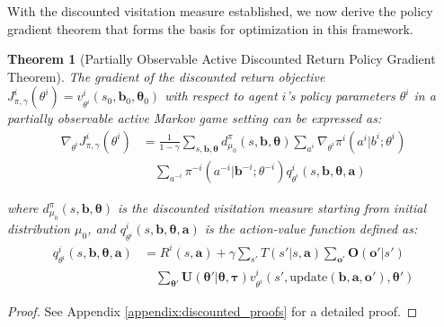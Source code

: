 \documentclass[a4paper,12pt]{report}
\newtheorem{theorem}{Theorem}
\begin{document}
With the discounted visitation measure established, we now derive the policy gradient theorem that forms the basis for optimization in this framework.
\begin{theorem}[Partially Observable Active Discounted Return Policy Gradient Theorem]
    \label{thm:discounted_gradient}
    The gradient of the discounted return objective $J^i_{\pi, \gamma}(\theta^i) = v^i_{\theta^i}(s_0, \boldsymbol{b}_0, \boldsymbol{\theta}_0)$ with respect to agent $i$'s policy parameters $\theta^i$ in a partially observable active Markov game setting can be expressed as:
    \begin{align}
        \nabla_{\theta^i} J^{i}_{\pi, \gamma}(\theta^i) & = \frac{1}{1-\gamma} \sum_{s, \boldsymbol{b}, \boldsymbol{\theta}} d^{\pi}_{\mu_0}(s, \boldsymbol{b}, \boldsymbol{\theta}) \sum_{a^i} \nabla_{\theta^i} \pi^i(a^i|b^i; \theta^i) \nonumber \\
                                                        & \quad \sum_{a^{-i}} \pi^{-i}(a^{-i}|\boldsymbol{b}^{-i}; \theta^{-i}) q^i_{\theta^i}(s, \boldsymbol{b}, \boldsymbol{\theta}, \boldsymbol{a})
        \label{eq:discounted_gradient}
    \end{align}

    where $d^{\pi}_{\mu_0}(s, \boldsymbol{b}, \boldsymbol{\theta})$ is the discounted visitation measure starting from initial distribution $\mu_0$, and $q^i_{\theta^i}(s, \boldsymbol{b}, \boldsymbol{\theta}, \boldsymbol{a})$ is the action-value function defined as:
    \begin{align}
        q^i_{\theta^i}(s, \boldsymbol{b}, \boldsymbol{\theta}, \boldsymbol{a}) & = R^i(s, \boldsymbol{a}) + \gamma \sum_{s'} T(s'|s, \boldsymbol{a}) \sum_{\boldsymbol{o}'} \boldsymbol{O}(\boldsymbol{o}'|s') \nonumber                                                                                \\
                                                                               & \quad \sum_{\boldsymbol{\theta}'} \boldsymbol{U}(\boldsymbol{\theta}'|\boldsymbol{\theta}, \boldsymbol{\tau}) v^i_{\theta^i}(s', \text{update}(\boldsymbol{b}, \boldsymbol{a}, \boldsymbol{o}'), \boldsymbol{\theta}')
        \label{eq:discounted_action_value}
    \end{align}

\end{theorem}

\begin{proof}
    See Appendix \ref{appendix:discounted_proofs} for a detailed proof.
\end{proof}
\end{document}
